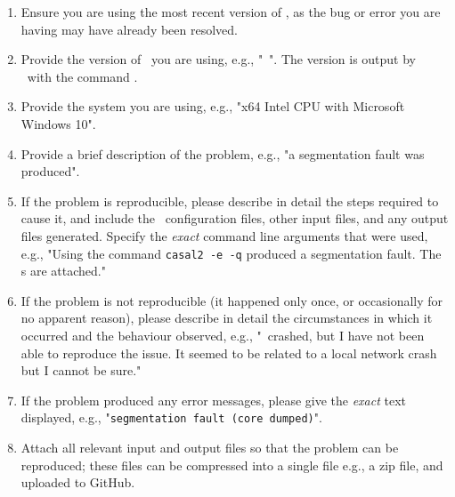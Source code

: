 \begin{enumerate}
\item Ensure you are using the most recent version of \CNAME, as the bug or error you are having may have already been resolved.
\item Provide the version of \CNAME\ you are using, e.g., "\CNAME\ \VER". The version is output by \CNAME\ with the command .
\item Provide the system  you are using, e.g., "x64 Intel CPU with Microsoft Windows 10".
\item Provide a brief description of the problem, e.g., "a segmentation fault was produced".
\item If the problem is reproducible, please describe in detail the steps required to cause it, and include the \CNAME\ configuration files, other input files, and any output files generated. Specify the \emph{exact} command line arguments that were used, e.g., "Using the command \texttt{casal2 -e -q} produced a segmentation fault. The \config s are attached."
\item If the problem is not reproducible (it happened only once, or occasionally for no apparent reason), please describe in detail the circumstances in which it occurred and the behaviour observed, e.g., "\CNAME\ crashed, but I have not been able to reproduce the issue. It seemed to be related to a local network crash but I cannot be sure."
\item If the problem produced any error messages, please give the \emph{exact} text displayed, e.g., "\texttt{segmentation fault (core dumped)}".
\item Attach all relevant input and output files so that the problem can be reproduced; these files can be compressed into a single file e.g., a zip file, and uploaded to GitHub.
\end{enumerate}
